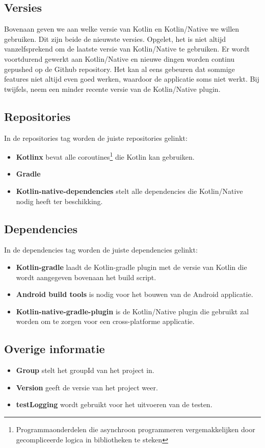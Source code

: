 \subsection{Versies}
Bovenaan geven we aan welke versie van Kotlin en Kotlin/Native we willen gebruiken. Dit zijn beide de nieuwste versies. Opgelet, het is niet altijd vanzelfsprekend om de laatste versie van Kotlin/Native te gebruiken. Er wordt voortdurend gewerkt aan Kotlin/Native en nieuwe dingen worden continu gepushed op de Github repository. Het kan al eens gebeuren dat sommige features niet altijd even goed werken, waardoor de applicatie soms niet werkt. Bij twijfels, neem een minder recente versie van de Kotlin/Native plugin.

\subsection{Repositories}
In de repositories tag worden de juiste repositories gelinkt:
\begin{itemize}
	\item \textbf{Kotlinx} bevat alle coroutines\footnote{Programmaonderdelen die asynchroon programmeren vergemakkelijken door gecompliceerde logica in bibliotheken te steken} die Kotlin kan gebruiken.
	\item \textbf{Gradle}
	\item \textbf{Kotlin-native-dependencies} stelt alle dependencies die Kotlin/Native nodig heeft ter beschikking.
\end{itemize}

\subsection{Dependencies}
In de dependencies tag worden de juiste dependencies gelinkt:
\begin{itemize}
	\item \textbf{Kotlin-gradle} laadt de Kotlin-gradle plugin met de versie van Kotlin die wordt aangegeven bovenaan het build script.
	\item \textbf{Android build tools} is nodig voor het bouwen van de Android applicatie.
	\item \textbf{Kotlin-native-gradle-plugin} is de Kotlin/Native plugin die gebruikt zal worden om te zorgen voor een cross-platforme applicatie.
\end{itemize}

\subsection{Overige informatie}
\label{sec:overige}
\begin{itemize}
	\item \textbf{Group} stelt het groupId van het project in.
	\item \textbf{Version} geeft de versie van het project weer.
	\item \textbf{testLogging} wordt gebruikt voor het uitvoeren van de testen.
\end{itemize}

